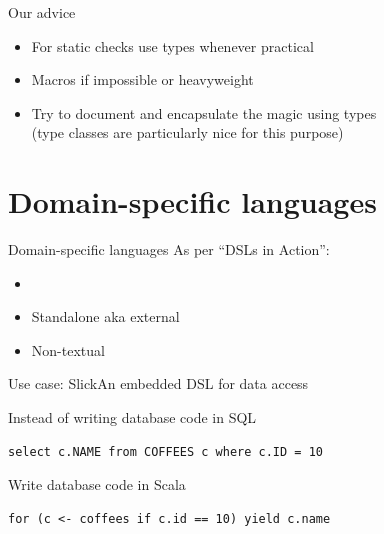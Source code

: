 \documentclass{beamer}
\begin{document}

\begin{frame}{Our advice}
  \begin{itemize}
  \item For static checks use types whenever practical
  \item Macros if impossible or heavyweight
  \item Try to document and encapsulate the magic using types\\
        (type classes are particularly nice for this purpose)
  \end{itemize}
\end{frame}

  \section{Domain-specific languages}

\begin{frame}{Domain-specific languages}
  As per ``DSLs in Action'':
  \begin{itemize}
  \item {}
  \item Standalone aka external
  \item Non-textual
  \end{itemize}
\end{frame}

\begin{frame}[fragile]{Use case: Slick}{An embedded DSL for data access}
  \vspace{1em}
  \begin{alertblock}{Instead of writing database code in SQL}
    \begin{verbatim}
select c.NAME from COFFEES c where c.ID = 10
    \end{verbatim}
  \end{alertblock}

  \vspace{1em}
  \begin{exampleblock}{Write database code in Scala}
    \begin{verbatim}
for (c <- coffees if c.id == 10) yield c.name
    \end{verbatim}
  \end{exampleblock}
\end{frame}
\end{document}
